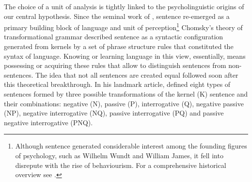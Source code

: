 \documentclass[a4paper, 12pt]{article}
\begin{document}
The choice of a unit of analysis is tightly linked to the psycholinguistic origins of our central hypothesis. Since the seminal work of \citet{Chomsky1957}, sentence re-emerged as a primary building block of language and unit of perception\footnote{Although sentence generated considerable interest among the founding figures of psychology, such as Wilhelm Wundt and William James, it fell into disrepute with the rise of behaviourism. For a comprehensive historical overview see \citet{Townsend2001}.} Chomsky's theory of transformational grammar described sentence as a syntactic configuration generated from kernels by a set of phrase structure rules that constituted the syntax of language. Knowing or learning language in this view, essentially, means possessing or acquiring these rules that allow to distinguish sentences from non-sentences. The idea that not all sentences are created equal followed soon after this theoretical breakthrough. In his landmark article, \citep{Miller1962} defined eight types of sentences formed by three possible transformations of the kernel (K) sentence and their combinations: negative (N), passive (P), interrogative (Q), negative passive (NP), negative interrogative (NQ), passive interrogative (PQ) and passive negative interrogative (PNQ).
\end{document}
